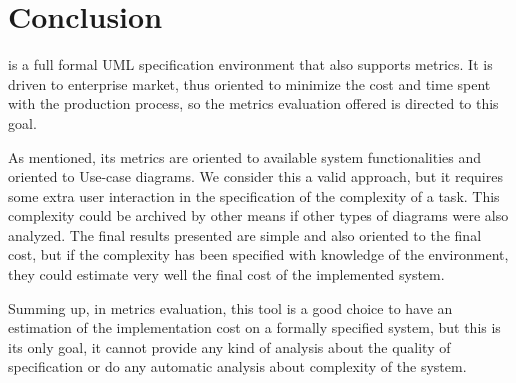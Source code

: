 \section{Conclusion} \label{conc}
\entArch is a full formal UML specification environment that also supports metrics. 
It is driven to enterprise market, thus oriented to minimize the cost and time spent with the production process, so the metrics evaluation offered is directed to this goal.

As mentioned, its metrics are oriented to available system functionalities and oriented to Use-case diagrams. 
We consider this a valid approach, but it requires some extra user interaction in the specification of the complexity of a task.
This complexity could be archived by other means if other types of diagrams were also analyzed.
The final results presented are simple and also oriented to the final cost, but if the complexity has been specified with knowledge of the environment, they could estimate very well the final cost of the implemented system.

Summing up, in metrics evaluation, this tool is a good choice to have an estimation of the implementation cost on a formally specified system, but this is its only goal, it cannot provide any kind of analysis about the quality of specification or do any automatic analysis about complexity of the system.

